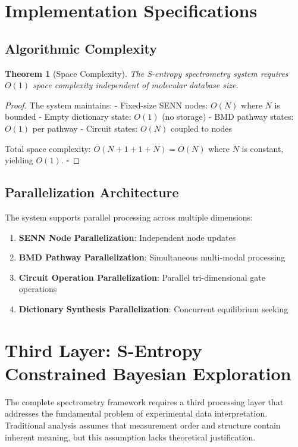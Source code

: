 \documentclass[12pt,a4paper]{article}
\newtheorem{theorem}{Theorem}
\begin{document}
\section{Implementation Specifications}

\subsection{Algorithmic Complexity}

\begin{theorem}[Space Complexity]
The S-entropy spectrometry system requires $O(1)$ space complexity independent of molecular database size.
\end{theorem}

\begin{proof}
The system maintains:
- Fixed-size SENN nodes: $O(N)$ where $N$ is bounded
- Empty dictionary state: $O(1)$ (no storage)
- BMD pathway states: $O(1)$ per pathway
- Circuit states: $O(N)$ coupled to nodes

Total space complexity: $O(N + 1 + 1 + N) = O(N)$ where $N$ is constant, yielding $O(1)$. $\square$
\end{proof}

\subsection{Parallelization Architecture}

The system supports parallel processing across multiple dimensions:

\begin{enumerate}
\item \textbf{SENN Node Parallelization}: Independent node updates
\item \textbf{BMD Pathway Parallelization}: Simultaneous multi-modal processing
\item \textbf{Circuit Operation Parallelization}: Parallel tri-dimensional gate operations
\item \textbf{Dictionary Synthesis Parallelization}: Concurrent equilibrium seeking
\end{enumerate}

\section{Third Layer: S-Entropy Constrained Bayesian Exploration}

The complete spectrometry framework requires a third processing layer that addresses the fundamental problem of experimental data interpretation. Traditional analysis assumes that measurement order and structure contain inherent meaning, but this assumption lacks theoretical justification.
\end{document}
